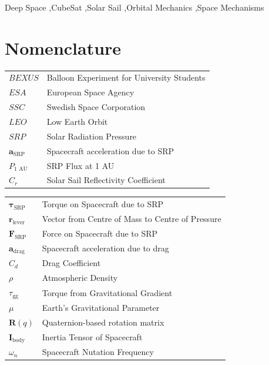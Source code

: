\documentclass[final,3p,times,twocolumn]{elsarticle}
\begin{document}
\begin{frontmatter}
\begin{abstract}
\end{abstract}

\begin{keyword}
Deep Space \sep CubeSat \sep Solar Sail \sep Orbital Mechanics \sep Space Mechanisms 
\end{keyword}

\end{frontmatter}
\linenumbers

\thispagestyle{firstpage}



\section*{Nomenclature}

\def\arraystretch{1.5}
\begin{tabularx}{\linewidth}{l X}
$BEXUS$ & Balloon Experiment for University Students \\
$ESA$ & European Space Agency \\
$SSC$ & Swedish Space Corporation \\
$LEO$ & Low Earth Orbit \\
$SRP$ & Solar Radiation Pressure \\
$\mathbf{a}_{\text{SRP}}$ & Spacecraft acceleration due to SRP \\
$P_{\text{1 AU}}$ & SRP Flux at 1 AU \\
$C_r$ & Solar Sail Reflectivity Coefficient \\
\end{tabularx}
\begin{tabularx}{\linewidth}{l X}
$\boldsymbol{\tau}_{\text{SRP}}$ & Torque on Spacecraft due to SRP \\
$\mathbf{r}_{\text{lever}}$ & Vector from Centre of Mass to Centre of Pressure \\
$\mathbf{F}_{\text{SRP}}$ & Force on Spacecraft due to SRP \\
$\mathbf{a}_{\text{drag}}$ & Spacecraft acceleration due to drag \\
$C_d$ & Drag Coefficient \\
$\rho$ & Atmospheric Density \\
$\tau_{\text{gg}}$ & Torque from Gravitational Gradient \\
$\mu$ & Earth's Gravitational Parameter \\
$\mathbf{R}(q)$ & Quaternion-based rotation matrix \\
$\mathbf{I}_{\text{body}}$ & Inertia Tensor of Spacecraft \\
$\omega_n$ & Spacecraft Nutation Frequency \\
\end{tabularx}
\end{document}
